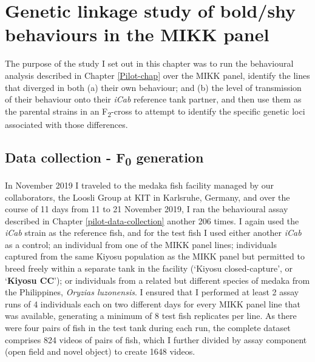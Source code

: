 \documentclass[
]{book}
\begin{document}
\hypertarget{MIKK-F2-chap}{%
\chapter{Genetic linkage study of bold/shy behaviours in the MIKK panel}\label{MIKK-F2-chap}}


The purpose of the study I set out in this chapter was to run the behavioural analysis described in Chapter \ref{Pilot-chap} over the MIKK panel, identify the lines that diverged in both (a) their own behaviour; and (b) the level of transmission of their behaviour onto their \emph{\textcolor{iCab_424B4D}{iCab}} reference tank partner, and then use them as the parental strains in an F\textsubscript{2}-cross to attempt to identify the specific genetic loci associated with those differences.

\hypertarget{data-collection---f0-generation}{%
\section{\texorpdfstring{Data collection - F\textsubscript{0} generation}{Data collection - F0 generation}}\label{data-collection---f0-generation}}

In November 2019 I traveled to the medaka fish facility managed by our collaborators, the Loosli Group at KIT in Karlsruhe, Germany, and over the course of 11 days from 11 to 21 November 2019, I ran the behavioural assay described in Chapter \ref{pilot-data-collection} another 206 times. I again used the \emph{\textcolor{iCab_424B4D}{iCab}} strain as the reference fish, and for the test fish I used either another \emph{\textcolor{iCab_424B4D}{iCab}} as a control; an individual from one of the MIKK panel lines; individuals captured from the same Kiyosu population as the MIKK panel but permitted to breed freely within a separate tank in the facility (`Kiyosu closed-capture', or `\textbf{Kiyosu CC}'); or individuals from a related but different species of medaka from the Philippines, \emph{Oryzias luzonensis}. I ensured that I performed at least 2 assay runs of 4 individuals each on two different days for every MIKK panel line that was available, generating a minimum of 8 test fish replicates per line. As there were four pairs of fish in the test tank during each run, the complete dataset comprises 824 videos of pairs of fish, which I further divided by assay component (open field and novel object) to create 1648 videos.
\end{document}
